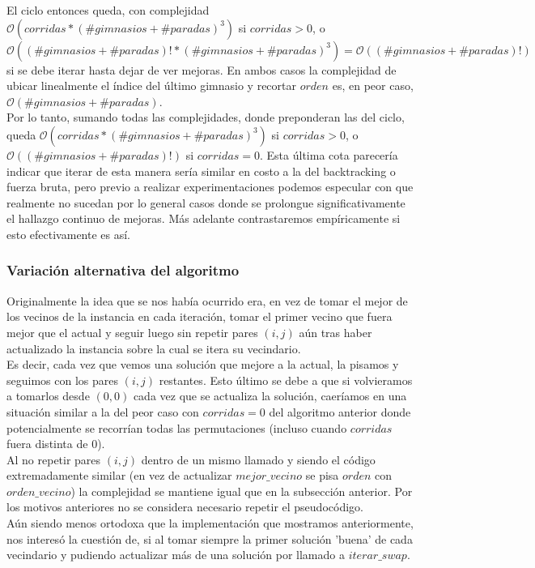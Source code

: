     El ciclo entonces queda, con complejidad $\mathcal{O}(corridas*(\#gimnasios + \#paradas)^3)$ si $corridas > 0$, o $\mathcal{O}((\#gimnasios + \#paradas)!*(\#gimnasios + \#paradas)^3) = \mathcal{O}((\#gimnasios + \#paradas)!)$ si se debe iterar hasta dejar de ver mejoras. En ambos casos la complejidad de ubicar linealmente el índice del último gimnasio y recortar $orden$ es, en peor caso, $\mathcal{O}(\#gimnasios + \#paradas)$.
    \\

    Por lo tanto, sumando todas las complejidades, donde preponderan las del ciclo, queda $\mathcal{O}(corridas*(\#gimnasios + \#paradas)^3)$ si $corridas > 0$, o $\mathcal{O}((\#gimnasios + \#paradas)!)$ si $corridas = 0$. Esta última cota parecería indicar que iterar de esta manera sería similar en costo a la del backtracking o fuerza bruta, pero previo a realizar experimentaciones podemos especular con que realmente no sucedan por lo general casos donde se prolongue significativamente el hallazgo continuo de mejoras. Más adelante contrastaremos empíricamente si esto efectivamente es así.

    \subsubsection{Variación alternativa del algoritmo}
    Originalmente la idea que se nos había ocurrido era, en vez de tomar el mejor de los vecinos de la instancia en cada iteración, tomar el primer vecino que fuera mejor que el actual y seguir luego sin repetir pares $(i,j)$ aún tras haber actualizado la instancia sobre la cual se itera su vecindario.
    \\

    Es decir, cada vez que vemos una solución que mejore a la actual, la pisamos y seguimos con los pares $(i,j)$ restantes. Esto último se debe a que si volvieramos a tomarlos desde $(0,0)$ cada vez que se actualiza la solución, caeríamos en una situación similar a la del peor caso con $corridas = 0$ del algoritmo anterior donde potencialmente se recorrían todas las permutaciones (incluso cuando $corridas$ fuera distinta de 0).
    \\

    Al no repetir pares $(i,j)$ dentro de un mismo llamado y siendo el código extremadamente similar (en vez de actualizar $mejor\_vecino$ se pisa $orden$ con $orden\_vecino$) la complejidad se mantiene igual que en la subsección anterior. Por los motivos anteriores no se considera necesario repetir el pseudocódigo.
    \\

    Aún siendo menos ortodoxa que la implementación que mostramos anteriormente, nos interesó la cuestión de, si al tomar siempre la primer solución 'buena' de cada vecindario y pudiendo actualizar más de una solución por llamado a $iterar\_swap$.
